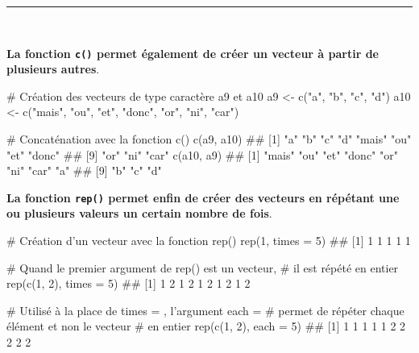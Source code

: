 \documentclass[12pt,twosided, notitlepage]{book}
\newenvironment{Shaded}{}{}
\newcommand{\KeywordTok}[1]{\textcolor[rgb]{0.00,0.00,1.00}{#1}}
\newcommand{\DataTypeTok}[1]{#1}
\newcommand{\DecValTok}[1]{#1}
\newcommand{\StringTok}[1]{\textcolor[rgb]{0.00,0.50,0.50}{#1}}
\newcommand{\CommentTok}[1]{\textcolor[rgb]{0.00,0.50,0.00}{#1}}
\newcommand{\NormalTok}[1]{#1}
\renewenvironment{Shaded}{\begin{snugshade}}{\end{snugshade}}
\begin{document}
\begin{center}\rule{0.5\linewidth}{\linethickness}\end{center}

~

\textbf{La fonction \texttt{c()} permet également de créer un vecteur à
partir de plusieurs autres}.

\begin{Shaded}
\begin{Highlighting}[]
\CommentTok{# Création des vecteurs de type caractère a9 et a10}
\NormalTok{a9 <-}\StringTok{ }\KeywordTok{c}\NormalTok{(}\StringTok{"a"}\NormalTok{, }\StringTok{"b"}\NormalTok{, }\StringTok{"c"}\NormalTok{, }\StringTok{"d"}\NormalTok{)}
\NormalTok{a10 <-}\StringTok{ }\KeywordTok{c}\NormalTok{(}\StringTok{"mais"}\NormalTok{, }\StringTok{"ou"}\NormalTok{, }\StringTok{"et"}\NormalTok{, }\StringTok{"donc"}\NormalTok{, }\StringTok{"or"}\NormalTok{, }\StringTok{"ni"}\NormalTok{, }\StringTok{"car"}\NormalTok{)}

\CommentTok{# Concaténation avec la fonction c()}
\KeywordTok{c}\NormalTok{(a9, a10)}
\NormalTok{  ##  [1] "a"    "b"    "c"    "d"    "mais" "ou"   "et"   "donc"}
\NormalTok{  ##  [9] "or"   "ni"   "car"}
\KeywordTok{c}\NormalTok{(a10, a9)}
\NormalTok{  ##  [1] "mais" "ou"   "et"   "donc" "or"   "ni"   "car"  "a"   }
\NormalTok{  ##  [9] "b"    "c"    "d"}
\end{Highlighting}
\end{Shaded}

\textbf{La fonction \texttt{rep()} permet enfin de créer des vecteurs en
répétant une ou plusieurs valeurs un certain nombre de
fois}.

\begin{Shaded}
\begin{Highlighting}[]
\CommentTok{# Création d'un vecteur avec la fonction rep()}
\KeywordTok{rep}\NormalTok{(}\DecValTok{1}\NormalTok{, }\DataTypeTok{times =} \DecValTok{5}\NormalTok{)}
\NormalTok{  ## [1] 1 1 1 1 1}

\CommentTok{# Quand le premier argument de rep() est un vecteur, }
\CommentTok{# il est répété en entier}
\KeywordTok{rep}\NormalTok{(}\KeywordTok{c}\NormalTok{(}\DecValTok{1}\NormalTok{, }\DecValTok{2}\NormalTok{), }\DataTypeTok{times =} \DecValTok{5}\NormalTok{)}
\NormalTok{  ##  [1] 1 2 1 2 1 2 1 2 1 2}

\CommentTok{# Utilisé à la place de times = , l'argument each = }
\CommentTok{# permet de répéter chaque élément et non le vecteur}
\CommentTok{# en entier}
\KeywordTok{rep}\NormalTok{(}\KeywordTok{c}\NormalTok{(}\DecValTok{1}\NormalTok{, }\DecValTok{2}\NormalTok{), }\DataTypeTok{each =} \DecValTok{5}\NormalTok{)}
\NormalTok{  ##  [1] 1 1 1 1 1 2 2 2 2 2}
\end{Highlighting}
\end{Shaded}
\end{document}
